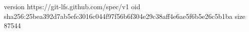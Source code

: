 version https://git-lfs.github.com/spec/v1
oid sha256:25bea392d7ab5efc3016c044f97f56b6f304e29c38aff4e6ae5f6b5e26c5b1ba
size 87544
